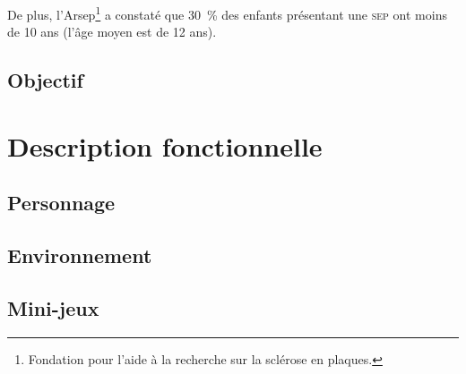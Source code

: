 \documentclass[a4paper,12pt,francais]{article}
\newcommand{\SEP}{\textsc{sep}\xspace}
\begin{document}
De plus, l’Arsep\footnote{Fondation pour l'aide à la recherche sur la sclérose en plaques.} a constaté que 30~\% des enfants présentant une \SEP ont moins de 10 ans (l’âge moyen est de 12 ans).

\subsection{Objectif}

\section{Description fonctionnelle}

\subsection{Personnage}
\subsection{Environnement}
\subsection{Mini-jeux}
\end{document}
